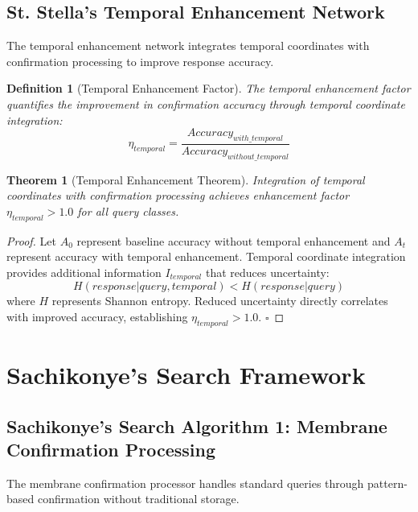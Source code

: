 \documentclass[12pt,a4paper]{article}
\newtheorem{theorem}{Theorem}
\newtheorem{definition}{Definition}
\begin{document}
\subsection{St. Stella's Temporal Enhancement Network}

The temporal enhancement network integrates temporal coordinates with confirmation processing to improve response accuracy.

\begin{definition}[Temporal Enhancement Factor]
The temporal enhancement factor quantifies the improvement in confirmation accuracy through temporal coordinate integration:
\begin{equation}
\eta_{temporal} = \frac{Accuracy_{with\_temporal}}{Accuracy_{without\_temporal}}
\end{equation}
\end{definition}

\begin{theorem}[Temporal Enhancement Theorem]
Integration of temporal coordinates with confirmation processing achieves enhancement factor $\eta_{temporal} > 1.0$ for all query classes.
\end{theorem}

\begin{proof}
Let $A_0$ represent baseline accuracy without temporal enhancement and $A_t$ represent accuracy with temporal enhancement. Temporal coordinate integration provides additional information $I_{temporal}$ that reduces uncertainty:
\begin{equation}
H(response | query, temporal) < H(response | query)
\end{equation}
where $H$ represents Shannon entropy. Reduced uncertainty directly correlates with improved accuracy, establishing $\eta_{temporal} > 1.0$. $\square$
\end{proof}

\section{Sachikonye's Search Framework}

\subsection{Sachikonye's Search Algorithm 1: Membrane Confirmation Processing}

The membrane confirmation processor handles standard queries through pattern-based confirmation without traditional storage.
\end{document}
